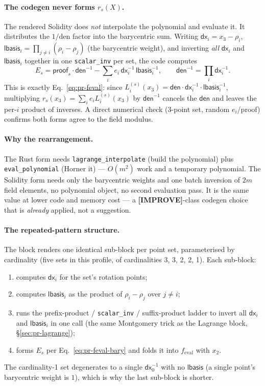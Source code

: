 \paragraph{The codegen never forms $r_s(X)$.} The rendered
Solidity does \emph{not} interpolate the polynomial and evaluate
it. It distributes the $1/\text{den}$ factor into the barycentric
sum. Writing
$\mathsf{dx}_i = x_3-\rho_i$,
$\mathsf{lbasis}_i=\prod_{j\ne i}(\rho_i-\rho_j)$ (the
barycentric weight), and inverting \emph{all}
$\mathsf{dx}_i$ and $\mathsf{lbasis}_i$ together in one
\texttt{scalar\_inv} per set, the code computes
\begin{equation}
E_s = \mathsf{proof}_s\cdot\mathsf{den}^{-1}
      - \sum_i e_i\,\mathsf{dx}_i^{-1}\,\mathsf{lbasis}_i^{-1},
\qquad \mathsf{den}^{-1}=\prod_i \mathsf{dx}_i^{-1}.
\label{eq:pr-feval-bary}
\end{equation}
This is exactly Eq.~\eqref{eq:pr-feval}: since
$L_i^{(s)}(x_3)=\mathsf{den}\cdot\mathsf{dx}_i^{-1}\cdot
\mathsf{lbasis}_i^{-1}$, multiplying
$r_s(x_3)=\sum_i e_i L_i^{(s)}(x_3)$ by $\mathsf{den}^{-1}$
cancels the $\mathsf{den}$ and leaves the per-$i$ product of
inverses. A direct numerical check (3-point set, random
$e_i$/proof) confirms both forms agree to the field modulus.

\paragraph{Why the rearrangement.} The Rust form needs
\texttt{lagrange\_\allowbreak{}interpolate} (build the polynomial) plus
\texttt{eval\_polynomial} (Horner it) --- $O(m^2)$ work and a
temporary polynomial. The Solidity form needs only the
barycentric weights and one batch inversion of $2m$ field
elements, no polynomial object, no second evaluation pass. It is
the same value at lower code and memory cost --- a
\textcolor{codegenblue}{\textbf{[IMPROVE]}}-class codegen choice
that is \emph{already} applied, not a suggestion.

\paragraph{The repeated-pattern structure.} The block renders one
identical sub-block per point set, parameterised by cardinality
(five sets in this profile, of cardinalities 3, 3, 2, 2, 1). Each sub-block:
\begin{enumerate}
\item computes $\mathsf{dx}_i$ for the set's rotation points;
\item computes $\mathsf{lbasis}_i$ as the product of
$\rho_i-\rho_j$ over $j\ne i$;
\item runs the prefix-product / \texttt{scalar\_inv} /
suffix-product ladder to invert all $\mathsf{dx}_i$ and
$\mathsf{lbasis}_i$ in one call (the same Montgomery trick as the
Lagrange block, §\ref{sec:pr-lagrange});
\item forms $E_s$ per Eq.~\eqref{eq:pr-feval-bary} and folds it
into $f_\text{eval}$ with $x_2$.
\end{enumerate}
The cardinality-1 set degenerates to a single
$\mathsf{dx}_0^{-1}$ with no $\mathsf{lbasis}$ (a single point's
barycentric weight is $1$), which is why the last sub-block is
shorter.


